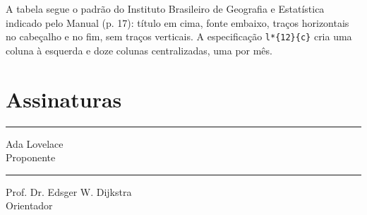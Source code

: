\documentclass[tcc-proposta]{texufpel}
\begin{document}
A tabela segue o padrão do Instituto Brasileiro de Geografia e Estatística
indicado pelo Manual (p. 17): título em cima, fonte embaixo, traços
horizontais no cabeçalho e no fim, sem traços verticais. A especificação
\verb|l*{12}{c}| cria uma coluna à esquerda e doze colunas centralizadas, uma
por mês.




\chapter*{Assinaturas}

\vspace{2cm}

\begin{center}
\rule{8cm}{.3mm}

Ada Lovelace\\          %
Proponente
\end{center}

\vspace{3cm}

\begin{center}
\rule{8cm}{.3mm}

Prof. Dr. Edsger W. Dijkstra\\   %
Orientador
\end{center}
\end{document}
